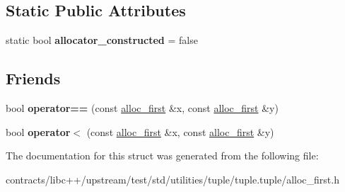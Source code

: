 \subsection*{Static Public Attributes}
\begin{DoxyCompactItemize}
\item 
\mbox{\label{structalloc__first_ac02b313c44d0f585ceaff717a54279fb}} 
static bool {\bfseries allocator\+\_\+constructed} = false
\end{DoxyCompactItemize}
\subsection*{Friends}
\begin{DoxyCompactItemize}
\item 
\mbox{\label{structalloc__first_a3b38cd8b916e0628c75f0b21be3face9}} 
bool {\bfseries operator==} (const \mbox{\hyperlink{structalloc__first}{alloc\+\_\+first}} \&x, const \mbox{\hyperlink{structalloc__first}{alloc\+\_\+first}} \&y)
\item 
\mbox{\label{structalloc__first_a85682bed1cc93624f2d47112eb448634}} 
bool {\bfseries operator$<$} (const \mbox{\hyperlink{structalloc__first}{alloc\+\_\+first}} \&x, const \mbox{\hyperlink{structalloc__first}{alloc\+\_\+first}} \&y)
\end{DoxyCompactItemize}


The documentation for this struct was generated from the following file\+:\begin{DoxyCompactItemize}
\item 
contracts/libc++/upstream/test/std/utilities/tuple/tuple.\+tuple/alloc\+\_\+first.\+h\end{DoxyCompactItemize}
